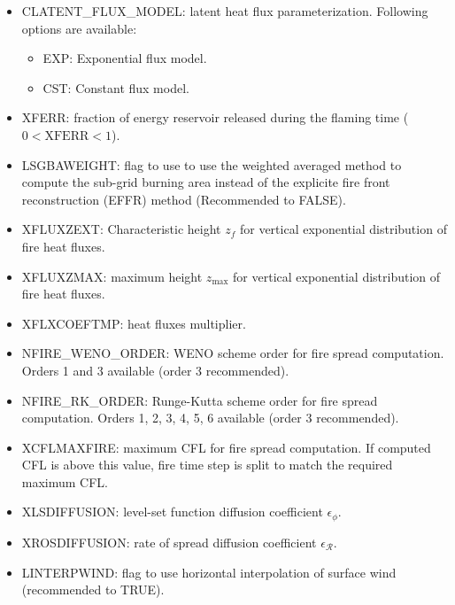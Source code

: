 \begin{itemize}
	\item
	CLATENT\_FLUX\_MODEL: latent heat flux parameterization. Following options are available:
	\begin{itemize}
		\item EXP: Exponential flux model.
		\item CST: Constant flux model.
	\end{itemize}
	\item
	XFERR: fraction of energy reservoir released during the flaming time ($0 < \mathrm{XFERR} < 1$).
	\item
	LSGBAWEIGHT: flag to use to use the weighted averaged method to compute the sub-grid burning area instead of the explicite fire front reconstruction (EFFR) method (Recommended to FALSE).
	\item
	XFLUXZEXT: Characteristic height $z_f$ for vertical exponential distribution of fire heat fluxes.
	\item
	XFLUXZMAX: maximum height $z_{\mathrm{max}}$ for vertical exponential distribution of fire heat fluxes.
	\item
	XFLXCOEFTMP: heat fluxes multiplier. 
	\item
	NFIRE\_WENO\_ORDER: WENO scheme order for fire spread computation. Orders 1 and 3 available (order 3 recommended).
	\item
	NFIRE\_RK\_ORDER: Runge-Kutta scheme order for fire spread computation. Orders 1, 2, 3, 4, 5, 6 available (order 3 recommended).
	\item
	XCFLMAXFIRE: maximum CFL for fire spread computation. If computed CFL is above this value, fire time step is split to match the required maximum CFL. 
	\item
	XLSDIFFUSION: level-set function diffusion coefficient $\epsilon_\phi$.
	\item
	XROSDIFFUSION: rate of spread diffusion coefficient $\epsilon_{\mathcal R}$.
	\item
	LINTERPWIND: flag to use horizontal interpolation of surface wind (recommended to TRUE).

\end{itemize}
